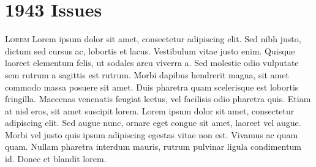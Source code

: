 \chapter{1943 Issues}
\lettrine{L}{orem} Lorem ipsum dolor sit amet, consectetur adipiscing elit. Sed nibh justo, dictum sed cursus ac, lobortis et lacus. Vestibulum vitae justo enim. Quisque laoreet elementum felis, ut sodales arcu viverra a. Sed molestie odio vulputate sem rutrum a sagittis est rutrum. Morbi dapibus hendrerit magna, sit amet commodo massa posuere sit amet. Duis pharetra quam scelerisque est lobortis fringilla. Maecenas venenatis feugiat lectus, vel facilisis odio pharetra quis. Etiam at nisl eros, sit amet suscipit lorem. Lorem ipsum dolor sit amet, consectetur adipiscing elit. Sed augue nunc, ornare eget congue sit amet, laoreet vel augue. Morbi vel justo quis ipsum adipiscing egestas vitae non est. Vivamus ac quam quam. Nullam pharetra
                                                    interdum mauris, rutrum pulvinar ligula condimentum id. Donec et blandit lorem. 

